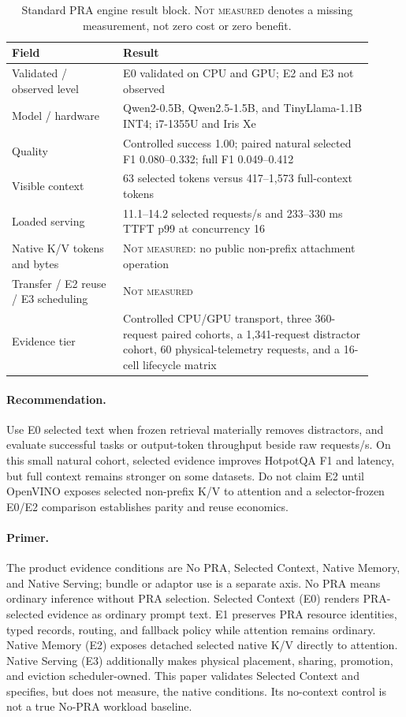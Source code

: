 \documentclass[10pt]{article}
\begin{document}
\begin{table}[H]
\centering
\small
\caption{Standard PRA engine result block. \textsc{Not measured} denotes a
missing measurement, not zero cost or zero benefit.}
\label{tab:openvino-qualification}
\begin{tabular}{p{0.28\linewidth}p{0.63\linewidth}}
\toprule
Field & Result \\
\midrule
Validated / observed level & E0 validated on CPU and GPU; E2 and E3 not observed \\
Model / hardware & Qwen2-0.5B, Qwen2.5-1.5B, and TinyLlama-1.1B INT4; i7-1355U and Iris Xe \\
Quality & Controlled success 1.00; paired natural selected F1 0.080--0.332; full F1 0.049--0.412 \\
Visible context & 63 selected tokens versus 417--1,573 full-context tokens \\
Loaded serving & 11.1--14.2 selected requests/s and 233--330 ms TTFT p99 at concurrency 16 \\
Native K/V tokens and bytes & \textsc{Not measured}: no public non-prefix attachment operation \\
Transfer / E2 reuse / E3 scheduling & \textsc{Not measured} \\
Evidence tier & Controlled CPU/GPU transport, three 360-request paired cohorts, a 1,341-request distractor cohort, 60 physical-telemetry requests, and a 16-cell lifecycle matrix \\
\bottomrule
\end{tabular}
\end{table}

\paragraph{Recommendation.}
Use E0 selected text when frozen retrieval materially removes distractors,
and evaluate successful tasks or output-token throughput beside raw
requests/s. On this small natural cohort, selected evidence improves HotpotQA
F1 and latency, but full context remains stronger on some datasets. Do not
claim E2 until OpenVINO exposes selected non-prefix K/V to attention and a
selector-frozen E0/E2 comparison establishes parity and reuse economics.

\paragraph{Primer.}
The product evidence conditions are No PRA, Selected Context, Native Memory,
and Native Serving; bundle or adaptor use is a separate axis. No PRA means
ordinary inference without PRA selection. Selected Context (E0) renders
PRA-selected evidence as ordinary prompt text. E1 preserves PRA resource
identities, typed records, routing, and fallback policy while attention remains
ordinary. Native Memory (E2) exposes detached selected native K/V directly to
attention. Native Serving (E3) additionally makes physical placement, sharing,
promotion, and eviction scheduler-owned. This paper validates Selected Context
and specifies, but does not measure, the native conditions. Its no-context
control is not a true No-PRA workload baseline.
\end{document}
